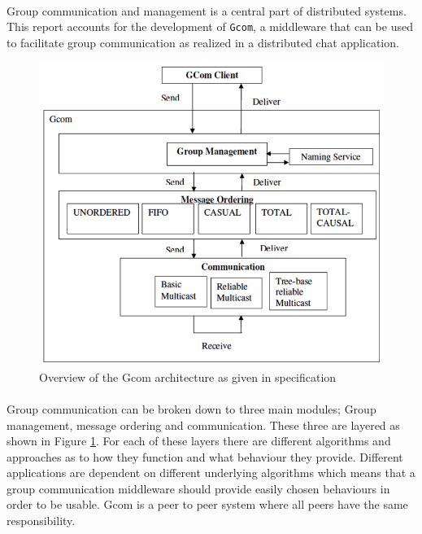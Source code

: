 \paragraph{}{
    Group communication and management is a central part of distributed systems.
This report accounts for the development of \texttt{Gcom}, a middleware that can be used to facilitate group communication as realized in a distributed chat application.
}

\begin{figure}[hb]
	\begin{center}
		\includegraphics[width=\textwidth]{figures/gcom_intro.png}
	\end{center}
	\caption{
		Overview of the Gcom architecture as given in specification
		\label{fig:gcom_spec}
	}
\end{figure}

\paragraph{}{
Group communication can be broken down to three main modules; Group management, message ordering and communication. These three are layered as shown in Figure \ref{fig:gcom_spec}. For each of these layers there are different algorithms and approaches as to how they function and what behaviour they provide.
Different applications are dependent on different underlying algorithms which means that a group communication middleware should provide easily chosen behaviours in order to be usable.
Gcom is a peer to peer system where all peers have the same responsibility.
}
